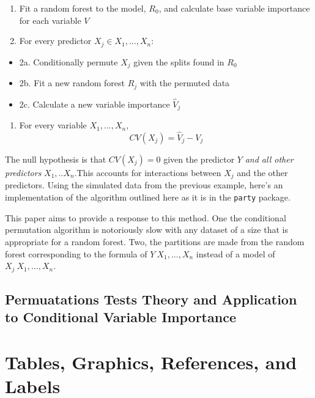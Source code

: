 \documentclass[12pt,twoside]{reedthesis}
\providecommand{\tightlist}{%
  \setlength{\itemsep}{0pt}\setlength{\parskip}{0pt}}
\begin{document}
  \begin{enumerate}
  \def\labelenumi{\arabic{enumi}.}
  \tightlist
  \item
    Fit a random forest to the model, \(R_0\), and calculate base variable
    importance for each variable \(V\)
  \item
    For every predictor \(X_j \in X_1,...,X_n\):
  \end{enumerate}
  
  \begin{itemize}
  \tightlist
  \item
    2a. Conditionally permute \(X_j\) given the splits found in \(R_0\)
  \item
    2b. Fit a new random forest \(R_j\) with the permuted data
  \item
    2c. Calculate a new variable importance \(\hat{V}_j\)
  \end{itemize}
  
  \begin{enumerate}
  \def\labelenumi{\arabic{enumi}.}
  \setcounter{enumi}{2}
  \tightlist
  \item
    For every variable \(X_1,..., X_n\), \[CV(X_j) = \hat{V}_j - V_j\]
  \end{enumerate}
  
  The null hypothesis is that \(CV(X_j) = 0\) given the predictor \(Y\)
  \emph{and all other predictors} \(X_1,..X_n\).This accounts for
  interactions between \(X_j\) and the other predictors. Using the
  simulated data from the previous example, here's an implementation of
  the algorithm outlined here as it is in the \texttt{party} package.
  
  This paper aims to provide a response to this method. One the
  conditional permutation algorithm is notoriously slow with any dataset
  of a size that is appropriate for a random forest. Two, the partitions
  are made from the random forest corresponding to the formula of
  \(Y~X_1,...,X_n\) instead of a model of \(X_j~X_1,...,X_n\).
  
  \section{Permuatations Tests Theory and Application to Conditional
  Variable
  Importance}\label{permuatations-tests-theory-and-application-to-conditional-variable-importance}
  
  \hypertarget{ref_labels}{\chapter{Tables, Graphics, References, and
  Labels}\label{ref_labels}}
  
\end{document}
